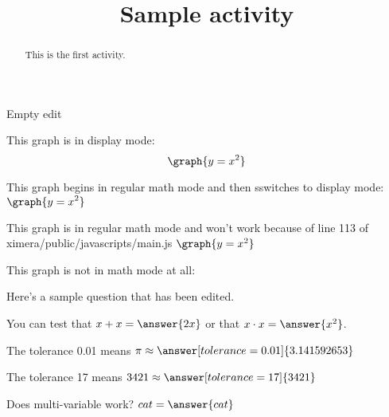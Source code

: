 \documentclass[handout]{ximera}
\title{Sample activity}
\begin{document}
\begin{abstract} This is the first activity.
\end{abstract}


\maketitle

Empty edit


This graph is in display mode:
\[ \graph{y=x^2} \]

This graph begins in regular math mode and then sswitches to display mode:
\( \displaystyle \graph{y=x^2} \)

This graph is in regular math mode and won't work because of line 113 of ximera/public/javascripts/main.js
\( \graph{y=x^2} \)

This graph is not in math mode at all:

Here's a sample question that has been edited. 


\begin{problem}
\begin{multipleChoice}
\end{multipleChoice}
\end{problem}

\begin{problem}
   You can test that $x + x = \answer{2x}$ or that $x \cdot x = \answer{x^2}$.
\end{problem}

\begin{problem}
   The tolerance 0.01 means $\pi \approx \answer[tolerance=0.01]{3.141592653}$
\end{problem}

\begin{problem}
   The tolerance 17 means $3421 \approx \answer[tolerance=17]{3421}$
\end{problem}

\begin{problem}
Does multi-variable work? $ cat = \answer{cat}$
\end{problem}
\end{document}
